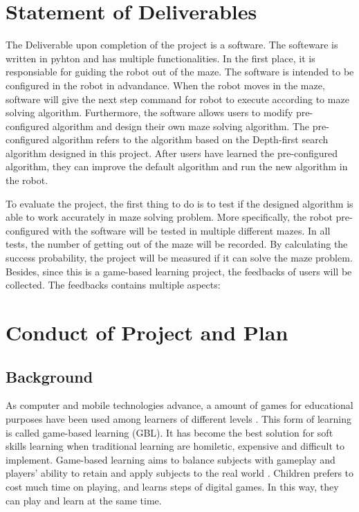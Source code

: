 \documentclass[11pt,times,oneside,openright,hardcopy]{eeereport}
\begin{document}
\section{Statement of Deliverables}
The Deliverable upon completion of the project is a software. The softeware is written in pyhton and has multiple functionalities. In the first place, it is responsiable for guiding the robot out of the maze.
The software is intended to be configured in the robot in advandance. When the robot moves in the maze, software will give the next step command for robot to execute according to maze solving algorithm.
Furthermore, the software allows users to modify pre-configured algorithm and design their own maze solving algorithm. The pre-configured algorithm refers to the algorithm based on the Depth-first search algorithm designed in this project.
After users have learned the pre-configured algorithm, they can improve the default algorithm and run the new algorithm in the robot.

To evaluate the project, the first thing to do is to test if the designed algorithm is able to work accurately in maze solving problem. More specifically, the robot pre-configured with the software will be tested in multiple different mazes.
In all tests, the number of getting out of the maze will be recorded. By calculating the success probability, the project will be measured if it can solve the maze problem.
Besides, since this is a game-based learning project, the feedbacks of users will be collected. The feedbacks contains multiple aspects:


\section{Conduct of Project and Plan}
\subsection{Background}
As computer and mobile technologies advance, a amount of games for educational purposes have been used among learners of different levels \cite{Proulx:2018fr}. This form of learning is called game-based learning (GBL). It has become the best solution for soft skills learning when traditional learning are homiletic, expensive and difficult to implement.
Game-based learning aims to balance subjects with gameplay and players' ability to retain and apply subjects to the real world \cite{Ifenthaler:2012tn}. Children prefers to cost much time on playing, and learns steps of digital games. In this way, they can play and learn at the same time.
\end{document}
